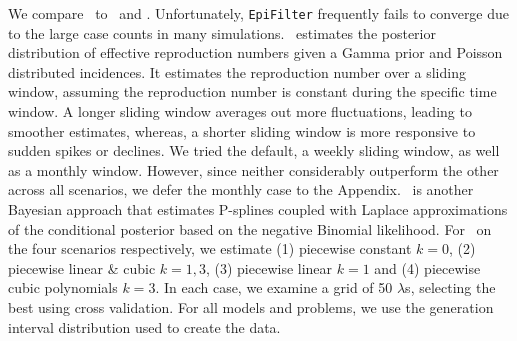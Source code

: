We compare \RtEstim\ to \EpiEstim\ and \EpiLPS. Unfortunately,
\texttt{EpiFilter} frequently fails to converge due to the large case counts in
many simulations. \EpiEstim\ estimates the posterior distribution of effective
reproduction numbers given a Gamma prior and Poisson distributed incidences. It
estimates the reproduction number over a sliding window, assuming the
reproduction number is constant during the specific time window. A longer
sliding window averages out more fluctuations, leading to smoother estimates,
whereas, a shorter sliding window is more responsive to sudden spikes or
declines. We tried the default, a weekly sliding window, as well as a monthly
window. However, since neither considerably outperform the other across all
scenarios, we defer the monthly case to the Appendix. \EpiLPS\ is another
Bayesian approach that estimates P-splines coupled with Laplace approximations
of the conditional posterior based on the negative Binomial likelihood. For
\RtEstim\ on the four scenarios respectively, we estimate (1) piecewise constant
$k=0$, (2) piecewise linear \& cubic $k=1,3$, (3) piecewise linear $k=1$ and (4)
piecewise cubic polynomials $k=3$. In each case, we examine a grid of 50
$\lambda$s, selecting the best using cross validation. For all models and
problems, we use the generation interval distribution used to create the data. 


